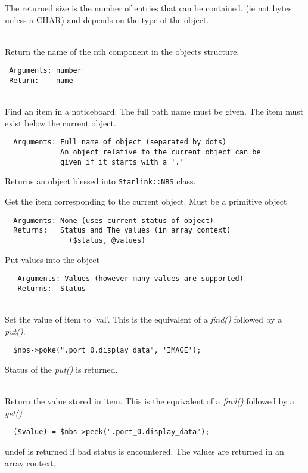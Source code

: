 \documentclass[twoside,11pt]{article}
\renewcommand{\_}{\texttt{\symbol{95}}}
\begin{document}
\begin{description}
The returned size is the number of entries that can be contained.
(ie not bytes unless a \_{}CHAR) and depends on the type of the object.

\item[nth\_{}name(num)]%
\index{nth_name(num)@nth\_{}name(num)}%
\hfill\\
Return the name of the nth component in the objects structure.
\begin{verbatim}
 Arguments: number
 Return:    name
\end{verbatim}

\item[find]%
%
\hfill\\
Find an item in a noticeboard. The full path name must be given.
The item must exist below the current object.
\begin{verbatim}
  Arguments: Full name of object (separated by dots)
             An object relative to the current object can be
             given if it starts with a '.'
\end{verbatim}

Returns an object blessed into {\tt Starlink::NBS} class.

\item[get]%
%

Get the item corresponding to the current object.
Must be a primitive object
\begin{verbatim}
  Arguments: None (uses current status of object)
  Returns:   Status and The values (in array context)
               ($status, @values)
\end{verbatim}

\item[put]%
%

Put values into the object
\begin{verbatim}
   Arguments: Values (however many values are supported)
   Returns:  Status
\end{verbatim}

\item[poke(item, val)]%
%
\hfill\\
Set the value of item to 'val'.
This is the equivalent of a {\em find()\/} followed by a {\em put()\/}.
\begin{verbatim}
  $nbs->poke(".port_0.display_data", 'IMAGE');
\end{verbatim}

Status of the {\em put()\/} is returned.

\item[peek(item)]%
%
\hfill\\
Return the value stored in item. This is the equivalent of a {\em find()\/}
followed by a {\em get()\/}
\begin{verbatim}
  ($value) = $nbs->peek(".port_0.display_data");
\end{verbatim}

undef is returned if bad status is encountered.
The values are returned in an array context.

\end{description}
\end{document}
